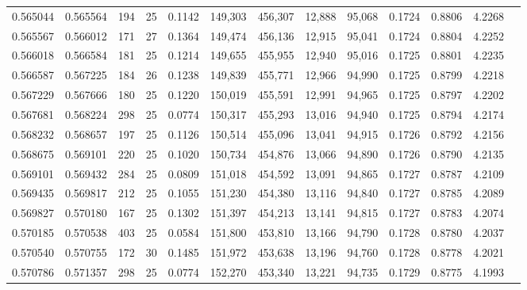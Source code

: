 \begin{tabular}{rrrrrrrrrrrrr}
0.565044 & 0.565564 &   194 &  25 &                                     0.1142 & 149,303 & 456,307 &  12,888 &  95,068 & 0.1724 & 0.8806 & 4.2268 \\
0.565567 & 0.566012 &   171 &  27 &                                     0.1364 & 149,474 & 456,136 &  12,915 &  95,041 & 0.1724 & 0.8804 & 4.2252 \\
0.566018 & 0.566584 &   181 &  25 &                                     0.1214 & 149,655 & 455,955 &  12,940 &  95,016 & 0.1725 & 0.8801 & 4.2235 \\
0.566587 & 0.567225 &   184 &  26 &                                     0.1238 & 149,839 & 455,771 &  12,966 &  94,990 & 0.1725 & 0.8799 & 4.2218 \\
0.567229 & 0.567666 &   180 &  25 &                                     0.1220 & 150,019 & 455,591 &  12,991 &  94,965 & 0.1725 & 0.8797 & 4.2202 \\
0.567681 & 0.568224 &   298 &  25 &                                     0.0774 & 150,317 & 455,293 &  13,016 &  94,940 & 0.1725 & 0.8794 & 4.2174 \\
0.568232 & 0.568657 &   197 &  25 &                                     0.1126 & 150,514 & 455,096 &  13,041 &  94,915 & 0.1726 & 0.8792 & 4.2156 \\
0.568675 & 0.569101 &   220 &  25 &                                     0.1020 & 150,734 & 454,876 &  13,066 &  94,890 & 0.1726 & 0.8790 & 4.2135 \\
0.569101 & 0.569432 &   284 &  25 &                                     0.0809 & 151,018 & 454,592 &  13,091 &  94,865 & 0.1727 & 0.8787 & 4.2109 \\
0.569435 & 0.569817 &   212 &  25 &                                     0.1055 & 151,230 & 454,380 &  13,116 &  94,840 & 0.1727 & 0.8785 & 4.2089 \\
0.569827 & 0.570180 &   167 &  25 &                                     0.1302 & 151,397 & 454,213 &  13,141 &  94,815 & 0.1727 & 0.8783 & 4.2074 \\
0.570185 & 0.570538 &   403 &  25 &                                     0.0584 & 151,800 & 453,810 &  13,166 &  94,790 & 0.1728 & 0.8780 & 4.2037 \\
0.570540 & 0.570755 &   172 &  30 &                                     0.1485 & 151,972 & 453,638 &  13,196 &  94,760 & 0.1728 & 0.8778 & 4.2021 \\
0.570786 & 0.571357 &   298 &  25 &                                     0.0774 & 152,270 & 453,340 &  13,221 &  94,735 & 0.1729 & 0.8775 & 4.1993 \\

\end{tabular}
